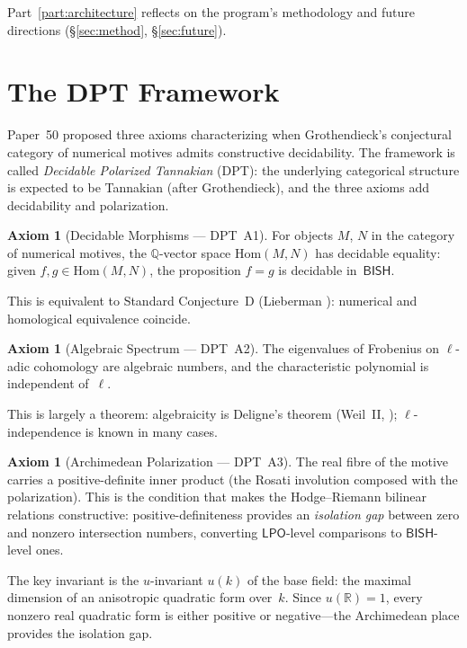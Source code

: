\documentclass[11pt]{article}
\theoremstyle{plain}
\theoremstyle{definition}
\newtheorem{axiom}[theorem]{Axiom}
\theoremstyle{remark}
\newcommand{\Q}{\mathbb{Q}}
\newcommand{\R}{\mathbb{R}}
\newcommand{\Hom}{\mathrm{Hom}}
\newcommand{\BISH}{\mathsf{BISH}}
\newcommand{\LPO}{\mathsf{LPO}}
\begin{document}
Part~\ref{part:architecture} reflects on the program's
methodology and future directions (\S\ref{sec:method},
\S\ref{sec:future}).


\section{The DPT Framework}\label{sec:dpt}

Paper~50 \cite{Paper50} proposed three axioms characterizing when
Grothendieck's conjectural category of numerical motives admits
constructive decidability.  The framework is called \emph{Decidable
Polarized Tannakian} (DPT): the underlying categorical structure
is expected to be Tannakian (after Grothendieck), and the three
axioms add decidability and polarization.

\begin{axiom}[Decidable Morphisms --- DPT~A1]\label{ax:A1}
For objects $M$, $N$ in the category of numerical motives,
the $\Q$-vector space $\Hom(M, N)$ has decidable equality:
given $f, g \in \Hom(M, N)$, the proposition $f = g$ is
decidable in~$\BISH$.

This is equivalent to Standard Conjecture~D (Lieberman
\cite{Lieberman1968}): numerical and homological equivalence
coincide.
\end{axiom}

\begin{axiom}[Algebraic Spectrum --- DPT~A2]\label{ax:A2}
The eigenvalues of Frobenius on $\ell$-adic cohomology are
algebraic numbers, and the characteristic polynomial is
independent of~$\ell$.

This is largely a theorem: algebraicity is Deligne's theorem
(Weil~II, \cite{Deligne1980}); $\ell$-independence is known in
many cases.
\end{axiom}

\begin{axiom}[Archimedean Polarization --- DPT~A3]\label{ax:A3}
The real fibre of the motive carries a positive-definite inner
product (the Rosati involution composed with the polarization).
This is the condition that makes the Hodge--Riemann bilinear
relations constructive: positive-definiteness provides an
\emph{isolation gap} between zero and nonzero intersection
numbers, converting $\LPO$-level comparisons to
$\BISH$-level ones.

The key invariant is the $u$-invariant $u(k)$ of the base
field: the maximal dimension of an anisotropic quadratic form
over~$k$.  Since $u(\R) = 1$, every nonzero real quadratic form
is either positive or negative---the Archimedean place provides
the isolation gap.
\end{axiom}
\end{document}
